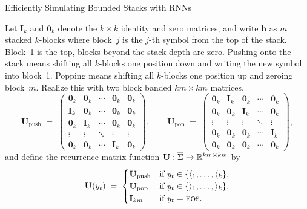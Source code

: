 \begin{question}{Efficiently Simulating Bounded Stacks with RNNs}
\begin{subquestion}
    Let $\mathbf{I}_k$ and $\mathbf{0}_k$ denote the $k\times k$ identity and zero matrices, and write $\mathbf{h}$ as $m$ stacked $k$-blocks where block~$j$ is the $j$-th symbol from the top of the stack. 
    Block~1 is the top, blocks beyond the stack depth are zero.
    Pushing onto the stack means shifting all $k$-blocks one position down and writing the new symbol into block~1. 
    Popping means shifting all $k$-blocks one position up and zeroing block~$m$. 
    Realize this with two block banded $km \times km$ matrices,
    \[
        \mathbf{U}_{\text{push}} \;=\;
        \begin{pmatrix}
            \mathbf{0}_k & \mathbf{0}_k & \cdots & \mathbf{0}_k & \mathbf{0}_k \\
            \mathbf{I}_k & \mathbf{0}_k & \cdots & \mathbf{0}_k & \mathbf{0}_k \\
            \mathbf{0}_k & \mathbf{I}_k & \cdots & \mathbf{0}_k & \mathbf{0}_k \\
            \vdots & \vdots & \ddots & \vdots & \vdots \\
            \mathbf{0}_k & \mathbf{0}_k & \cdots & \mathbf{I}_k & \mathbf{0}_k
        \end{pmatrix},
        \qquad
        \mathbf{U}_{\text{pop}} \;=\;
        \begin{pmatrix}
            \mathbf{0}_k & \mathbf{I}_k & \mathbf{0}_k & \cdots & \mathbf{0}_k \\
            \mathbf{0}_k & \mathbf{0}_k & \mathbf{I}_k & \cdots & \mathbf{0}_k \\
            \vdots & \vdots & \vdots & \ddots & \vdots \\
            \mathbf{0}_k & \mathbf{0}_k & \mathbf{0}_k & \cdots & \mathbf{I}_k \\
            \mathbf{0}_k & \mathbf{0}_k & \mathbf{0}_k & \cdots & \mathbf{0}_k
        \end{pmatrix},
    \]
    and define the recurrence matrix function $\mathbf{U} : \overline{\alphabet} \to \mathbb{R}^{km \times km}$ by
    \[
        \mathbf{U}(y_t) \;=\;
        \begin{cases}
            \mathbf{U}_{\text{push}} & \text{if } y_t \in \{\openBr{1}, \dots, \openBr{k}\}, \\
            \mathbf{U}_{\text{pop}}  & \text{if } y_t \in \{\closeBr{1}, \dots, \closeBr{k}\}, \\
            \mathbf{I}_{km}          & \text{if } y_t = \eos.
        \end{cases}
\]
\end{subquestion}
\end{question}
